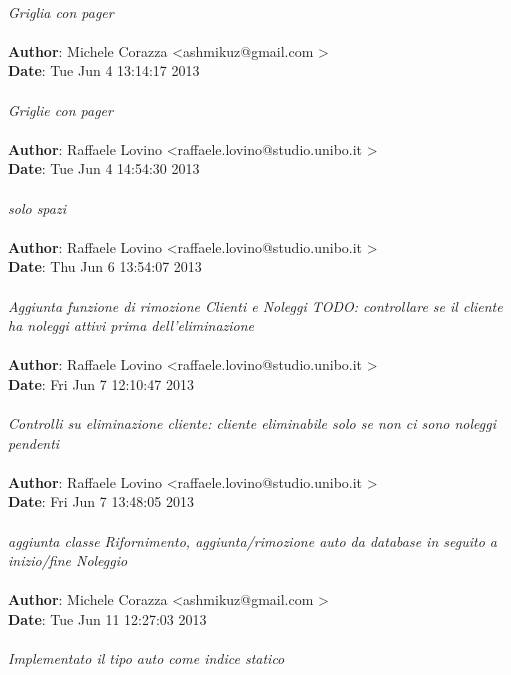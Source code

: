 \documentclass[a4paper,12pt]{article} %
\begin{document}
\\
    \emph{Griglia con pager}\\
\\
\textbf{Author}: Michele Corazza \textless ashmikuz@gmail.com \textgreater \\
\textbf{Date}:   Tue Jun 4 13:14:17 2013 \\
\\
    \emph{Griglie con pager}\\
\\
\textbf{Author}: Raffaele Lovino \textless raffaele.lovino@studio.unibo.it \textgreater \\
\textbf{Date}:   Tue Jun 4 14:54:30 2013 \\
\\
    \emph{solo spazi}\\
\\
\textbf{Author}: Raffaele Lovino \textless raffaele.lovino@studio.unibo.it \textgreater \\
\textbf{Date}:   Thu Jun 6 13:54:07 2013 \\
\\
    \emph{Aggiunta funzione di rimozione Clienti e Noleggi
    TODO: controllare se il cliente ha noleggi attivi prima dell'eliminazione}\\
\\
\textbf{Author}: Raffaele Lovino \textless raffaele.lovino@studio.unibo.it \textgreater \\
\textbf{Date}:   Fri Jun 7 12:10:47 2013 \\
\\
    \emph{Controlli su eliminazione cliente: cliente eliminabile solo se non ci sono noleggi pendenti}\\
\\
\textbf{Author}: Raffaele Lovino \textless raffaele.lovino@studio.unibo.it \textgreater \\
\textbf{Date}:   Fri Jun 7 13:48:05 2013 \\
\\
    \emph{aggiunta classe Rifornimento, aggiunta/rimozione auto da database in seguito a inizio/fine Noleggio}\\
\\
\textbf{Author}: Michele Corazza \textless ashmikuz@gmail.com \textgreater \\
\textbf{Date}:   Tue Jun 11 12:27:03 2013 \\
\\
    \emph{Implementato il tipo auto come indice statico} \\
\end{document}
